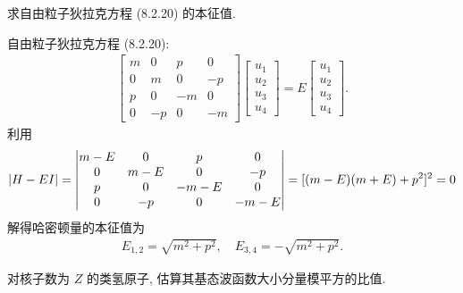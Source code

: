 \documentclass{assignment}
\begin{document}
\begin{prob}[课本习题 8.11]
    求自由粒子狄拉克方程 (8.2.20) 的本征值.
\end{prob}
\begin{sol}
    自由粒子狄拉克方程 (8.2.20):
    \begin{align}
        \begin{bmatrix}
            m&0&p&0\\
            0&m&0&-p\\
            p&0&-m&0\\
            0&-p&0&-m
        \end{bmatrix}\begin{bmatrix}
            u_1\\
            u_2\\
            u_3\\
            u_4
        \end{bmatrix}=E\begin{bmatrix}
            u_1\\
            u_2\\
            u_3\\
            u_4
        \end{bmatrix}.
    \end{align}
    利用
    \begin{align}
        \left\lvert H-EI\right\rvert=\begin{vmatrix}
            m-E&0&p&0\\
            0&m-E&0&-p\\
            p&0&-m-E&0\\
            0&-p&0&-m-E
        \end{vmatrix}=[(m-E)(m+E)+p^2]^2=0
    \end{align}
    解得哈密顿量的本征值为
    \begin{align}
        E_{1,2}=\sqrt{m^2+p^2},\quad E_{3,4}=-\sqrt{m^2+p^2}.
    \end{align}
\end{sol}

\begin{prob}
    对核子数为 $Z$ 的类氢原子, 估算其基态波函数大小分量模平方的比值.
\end{prob}
\begin{sol}
    
\end{sol}
\end{document}

